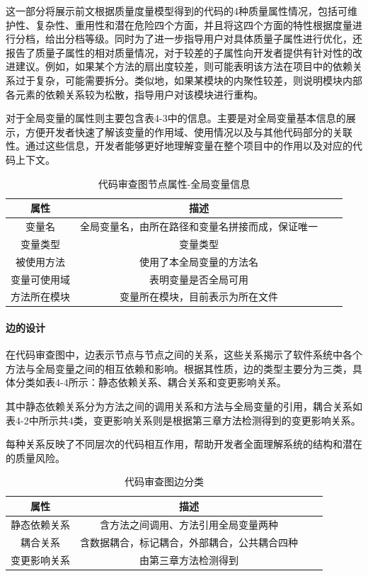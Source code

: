 这一部分将展示前文根据质量度量模型得到的代码的4种质量属性情况，包括可维护性、复杂性、重用性和潜在危险四个方面，并且将这四个方面的特性根据度量进行分档，给出分档等级。同时为了进一步指导用户对具体质量子属性进行优化，还报告了质量子属性的相对质量情况，对于较差的子属性向开发者提供有针对性的改进建议。例如，如果某个方法的扇出度较差，则可能表明该方法在项目中的依赖关系过于复杂，可能需要拆分。类似地，如果某模块的内聚性较差，则说明模块内部各元素的依赖关系较为松散，指导用户对该模块进行重构。

对于全局变量的属性则主要包含表4-3中的信息。主要是对全局变量基本信息的展示，方便开发者快速了解该变量的作用域、使用情况以及与其他代码部分的关联性。通过这些信息，开发者能够更好地理解变量在整个项目中的作用以及对应的代码上下文。

\begin{table}[htbp]
\caption{代码审查图节点属性-全局变量信息}
\vspace{0.5em}\centering\wuhao
\begin{tabular}{cccc}
\toprule
    属性 & 描述 \\
\midrule
变量名 & 全局变量名，由所在路径和变量名拼接而成，保证唯一  \\
变量类型 & 变量类型   \\
被使用方法 & 使用了本全局变量的方法名   \\
变量可使用域 & 表明变量是否全局可用   \\
方法所在模块 &  变量所在模块，目前表示为所在文件  \\  
\bottomrule
\end{tabular}
\end{table}


\paragraph{边的设计}

在代码审查图中，边表示节点与节点之间的关系，这些关系揭示了软件系统中各个方法与全局变量之间的相互依赖和影响。根据其性质，边的类型主要分为三类，具体分类如表4-4所示：静态依赖关系、耦合关系和变更影响关系。

其中静态依赖关系分为方法之间的调用关系和方法与全局变量的引用，耦合关系如表4-2中所示共4类，变更影响关系则是根据第三章方法检测得到的变更影响关系。

每种关系反映了不同层次的代码相互作用，帮助开发者全面理解系统的结构和潜在的质量风险。

\begin{table}[htbp]
\caption{代码审查图边分类}
\vspace{0.5em}\centering\wuhao
\begin{tabular}{cccc}
\toprule
属性 & 描述 \\
\midrule
静态依赖关系 & 含方法之间调用、方法引用全局变量两种  \\
耦合关系 & 含数据耦合，标记耦合，外部耦合，公共耦合四种   \\
变更影响关系 & 由第三章方法检测得到  \\
\bottomrule
\end{tabular}
\end{table}



